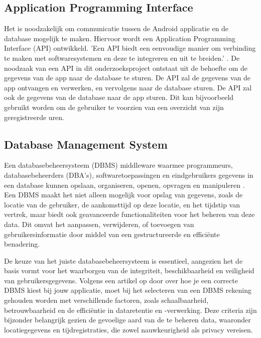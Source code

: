 \subsection{Application Programming Interface}
Het is noodzakelijk om communicatie tussen de Android applicatie en de database mogelijk te maken. Hiervoor wordt een Application Programming Interface (API) ontwikkeld. 'Een API biedt een eenvoudige manier om verbinding te maken met softwaresystemen en deze te integreren en uit te breiden.' \autocite{biehl2015api}. De noodzaak van een API in dit onderzoeksproject ontstaat uit de behoefte om de gegevens van de app naar de database te sturen. De API zal de gegevens van de app ontvangen en verwerken, en vervolgens naar de database sturen. De API zal ook de gegevens van de database naar de app sturen. Dit kan bijvoorbeeld gebruikt worden om de gebruiker te voorzien van een overzicht van zijn geregistreerde uren.

\subsection{Database Management System}
Een databasebeheersysteem (DBMS) middleware waarmee programmeurs, databasebeheerders (DBA's), softwaretoepassingen en eindgebruikers gegevens in een database kunnen opslaan, organiseren, openen, opvragen en manipuleren \autocite{Rouse2024}. Een DBMS maakt het niet alleen mogelijk voor opslag van gegevens, zoals de locatie van de gebruiker, de aankomsttijd op deze locatie, en het tijdstip van vertrek, maar biedt ook geavanceerde functionaliteiten voor het beheren van deze data. Dit omvat het aanpassen, verwijderen, of toevoegen van gebruikersinformatie door middel van een gestructureerde en efficiënte benadering.

De keuze van het juiste databasebeheersysteem is essentieel, aangezien het de basis vormt voor het waarborgen van de integriteit, beschikbaarheid en veiligheid van gebruikersgegevens. Volgens een artikel op door \textcite{SilnitskyDatabase} over hoe je een correcte DBMS kiest bij jouw applicatie, moet bij het selecteren van een DBMS rekening gehouden worden met verschillende factoren, zoals schaalbaarheid, betrouwbaarheid en de efficiëntie in dataretentie en -verwerking. Deze criteria zijn bijzonder belangrijk gezien de gevoelige aard van de te beheren data, waaronder locatiegegevens en tijdregistraties, die zowel nauwkeurigheid als privacy vereisen.


